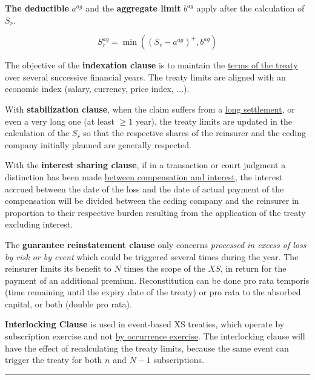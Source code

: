 \begin{f}

\textbf{The deductible} $a^{ag}$ and the \textbf{aggregate limit} $b^{ag}$ apply after the calculation of $S_r$.

$$
S_r^{ag} = \min\left( \left(S_r - a^{ag}  \right)^+,b^{ag}\right)  
$$
\medskip

The objective of the \textbf{indexation clause} is to maintain the \underline{terms of the treaty} over several successive financial years. The treaty limits are aligned with an economic index (salary, currency, price index, ...).
\medskip

With \textbf{stabilization clause}, when the claim suffers from a \underline{long settlement}, or even a very long one (at least $\geq 1$ year), the treaty limits are updated in the calculation of the $S_r$ so that the respective shares of the reinsurer and the ceding company initially planned are generally respected.
\medskip
	

With the \textbf{interest sharing clause}, if in a transaction or court judgment a distinction has been made \underline{between compensation and interest}, the interest accrued between the date of the loss and the date of actual payment of the compensation will be divided between the ceding company and the reinsurer in proportion to their respective burden resulting from the application of the treaty excluding interest.


\medskip


The \textbf{guarantee reinstatement clause}
only concerns \emph{processed in excess of loss by risk or by event} which could be triggered several times during the year.
The reinsurer limits its benefit to $N$ times the scope of the $XS$, in return for the payment of an additional premium.
Reconstitution can be done pro rata temporis (time remaining until the expiry date of the treaty) or pro rata to the absorbed capital, or both (double pro rata).




\textbf{Interlocking Clause} is used in event-based XS treaties, which operate by subscription exercise and not \underline{by occurrence exercise}.
The interlocking clause will have the effect of recalculating the treaty limits, because the same event can trigger the treaty for both $n$ and $N-1$ subscriptions.


\end{f}
\hrule

